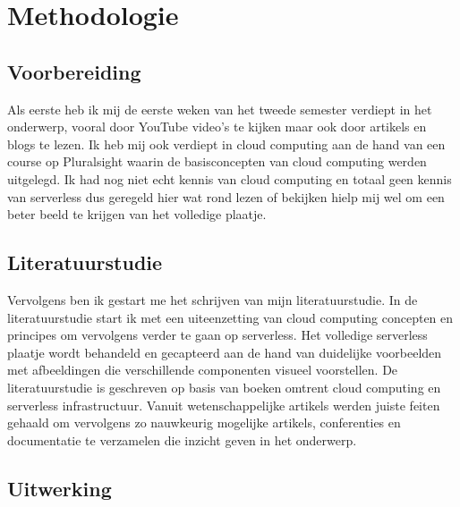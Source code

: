 
\chapter{Methodologie}
\label{ch:methodologie}


\section{Voorbereiding}
Als eerste heb ik mij de eerste weken van het tweede semester verdiept in het onderwerp, vooral door YouTube video's te kijken maar ook door artikels en blogs te lezen. Ik heb mij ook  verdiept in cloud computing aan de hand van een course op Pluralsight waarin de basisconcepten van cloud computing werden uitgelegd. Ik had nog niet echt kennis van cloud computing en totaal geen kennis van serverless dus geregeld hier wat rond lezen of bekijken hielp mij wel om een beter beeld te krijgen van het volledige plaatje. 

\section{Literatuurstudie}
Vervolgens ben ik gestart me het schrijven van mijn literatuurstudie. In de literatuurstudie start ik met een uiteenzetting van cloud computing concepten en principes om vervolgens verder te gaan op serverless. Het volledige serverless plaatje wordt behandeld en gecapteerd aan de hand van duidelijke voorbeelden met afbeeldingen die verschillende componenten visueel voorstellen. De literatuurstudie is geschreven op basis van boeken omtrent cloud computing en serverless infrastructuur. Vanuit wetenschappelijke artikels werden juiste feiten gehaald om vervolgens zo nauwkeurig mogelijke artikels, conferenties en documentatie te verzamelen die inzicht geven in het onderwerp.

\section{Uitwerking}
